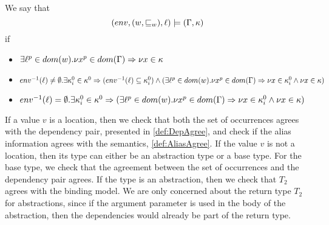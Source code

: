 \documentclass{llncs}
\newcommand{\sqleq}{\ensuremath{\sqsubseteq\xspace}}
\begin{document}
      \begin{definition}\label{def:AliasAgree}
	We say that
	$$(env,(w,\sqleq_w),\loc)\models(\Gamma,\kappa)$$
	if
	\begin{itemize}
		\item $\exists \ell^p\in dom(w).\nu x^p\in dom(\Gamma)\Rightarrow\nu x\in\kappa$
		\item $env^{-1}(\ell)\neq\emptyset.\exists \kappa^0_i\in\kappa^0\Rightarrow
			(env^{-1}(\ell)\subseteq\kappa^0_i)\wedge(\exists \ell^p\in dom(w).\nu x^p\in dom(\Gamma)\Rightarrow\\\nu x\in\kappa^0_i\wedge\nu x\in\kappa)$
		\item $env^{-1}(\ell)=\emptyset.\exists \kappa^0_i\in\kappa^0\Rightarrow
			(\exists \ell^p\in dom(w).\nu x^p\in dom(\Gamma)\Rightarrow\nu x\in\kappa^0_i\wedge\nu x\in\kappa)$
	\end{itemize}
\end{definition}

If a value $v$ is a location, then we check that both the set of occurrences agrees with the dependency pair, presented in \cref{def:DepAgree}, 
and check if the alias information agrees with the semantics, \cref{def:AliasAgree}.
If the value $v$ is not a location, then its type can either be an
abstraction type or a base type.
For the base type, we check that the agreement between the set of occurrences and the dependency pair agrees.
If the type is an abstraction, then we check that $T_2$ agrees with 
the binding model. 
We are only concerned about the return type $T_2$ for abstractions,
since if the argument parameter is used in the body of the
abstraction, then the dependencies would already be part of the return
type. 
\end{document}
